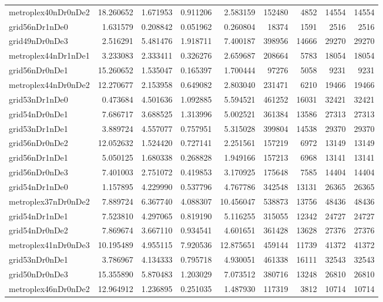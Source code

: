 \begin{longtable}{|l|r|r|r|r|r|r|r|r|}
metroplex40nDr0nDe2 & 18.260652 & 1.671953 & 0.911206 & 2.583159 & 152480 & 4852 & 14554 & 14554 \\
grid56nDr1nDe0 & 1.631579 & 0.208842 & 0.051962 & 0.260804 & 18374 & 1591 & 2516 & 2516 \\
grid49nDr0nDe3 & 2.516291 & 5.481476 & 1.918711 & 7.400187 & 398956 & 14666 & 29270 & 29270 \\
metroplex44nDr1nDe1 & 3.233083 & 2.333411 & 0.326276 & 2.659687 & 208664 & 5783 & 18054 & 18054 \\
grid56nDr0nDe1 & 15.260652 & 1.535047 & 0.165397 & 1.700444 & 97276 & 5058 & 9231 & 9231 \\
metroplex44nDr0nDe2 & 12.270677 & 2.153958 & 0.649082 & 2.803040 & 231471 & 6210 & 19466 & 19466 \\
grid53nDr1nDe0 & 0.473684 & 4.501636 & 1.092885 & 5.594521 & 461252 & 16031 & 32421 & 32421 \\
grid54nDr0nDe1 & 7.686717 & 3.688525 & 1.313996 & 5.002521 & 361384 & 13586 & 27313 & 27313 \\
grid53nDr1nDe1 & 3.889724 & 4.557077 & 0.757951 & 5.315028 & 399804 & 14538 & 29370 & 29370 \\
grid56nDr0nDe2 & 12.052632 & 1.524420 & 0.727141 & 2.251561 & 157219 & 6972 & 13149 & 13149 \\
grid56nDr1nDe1 & 5.050125 & 1.680338 & 0.268828 & 1.949166 & 157213 & 6968 & 13141 & 13141 \\
grid56nDr0nDe3 & 7.401003 & 2.751072 & 0.419853 & 3.170925 & 175648 & 7585 & 14404 & 14404 \\
grid54nDr1nDe0 & 1.157895 & 4.229990 & 0.537796 & 4.767786 & 342548 & 13131 & 26365 & 26365 \\
metroplex37nDr0nDe2 & 7.889724 & 6.367740 & 4.088307 & 10.456047 & 538873 & 13756 & 48436 & 48436 \\
grid54nDr1nDe1 & 7.523810 & 4.297065 & 0.819190 & 5.116255 & 315055 & 12342 & 24727 & 24727 \\
grid54nDr0nDe2 & 7.869674 & 3.667110 & 0.934541 & 4.601651 & 361428 & 13628 & 27376 & 27376 \\
metroplex41nDr0nDe3 & 10.195489 & 4.955115 & 7.920536 & 12.875651 & 459144 & 11739 & 41372 & 41372 \\
grid53nDr0nDe1 & 3.786967 & 4.134333 & 0.795718 & 4.930051 & 461338 & 16111 & 32543 & 32543 \\
grid50nDr0nDe3 & 15.355890 & 5.870483 & 1.203029 & 7.073512 & 380716 & 13248 & 26810 & 26810 \\
metroplex46nDr0nDe2 & 12.964912 & 1.236895 & 0.251035 & 1.487930 & 117319 & 3812 & 10714 & 10714 \\

\end{longtable}
